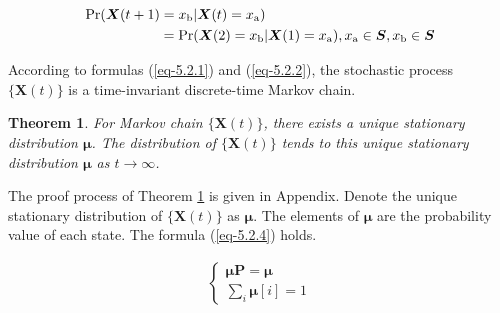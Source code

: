\documentclass[lettersize,journal]{IEEEtran}
\newtheorem{theorem}{Theorem}
\begin{document}
\begin{equation}
	\begin{aligned}
		{\rm Pr}( \boldsymbol{X}(t+1) = x_{\rm b}& | \boldsymbol{X}(t) = x_{\rm a})\\
		={\rm Pr}&( \boldsymbol{X}(2) = x_{\rm b} | \boldsymbol{X}(1) = x_{\rm a}),
		x_{\rm a} \in \boldsymbol{S}, x_{\rm b} \in \boldsymbol{S}
	\end{aligned}
	\label{eq-5.2.2}
\end{equation}


According to formulas (\ref{eq-5.2.1}) and  (\ref{eq-5.2.2}), the stochastic process $\{\boldsymbol{X}(t)\}$ is a time-invariant discrete-time Markov chain.

\begin{theorem}\label{theorem-5.2.4}
	For Markov chain $\{\boldsymbol{X}(t)\}$, there exists a unique stationary distribution $\boldsymbol{\mu}$. The distribution of $\{\boldsymbol{X}(t)\}$ tends to this unique stationary distribution $\boldsymbol{\mu}$ as $t\to \infty$.
\end{theorem}

The proof process of Theorem \ref{theorem-5.2.4} is given in Appendix. Denote the unique stationary distribution of $\{\boldsymbol{X}(t)\}$ as $\boldsymbol{\mu}$. The elements of $\boldsymbol{\mu}$ are the probability value of each state. The formula (\ref{eq-5.2.4}) holds.

\begin{equation}
	\begin{aligned}
		\left\{ 
		\begin{matrix}
			\boldsymbol{\mu P} = \boldsymbol{\mu} \\
			\sum\limits_{i} \boldsymbol{\mu}[i] = 1
			\label{eq-5.2.4}
		\end{matrix}
		\right.
	\end{aligned}
\end{equation}
\end{document}
